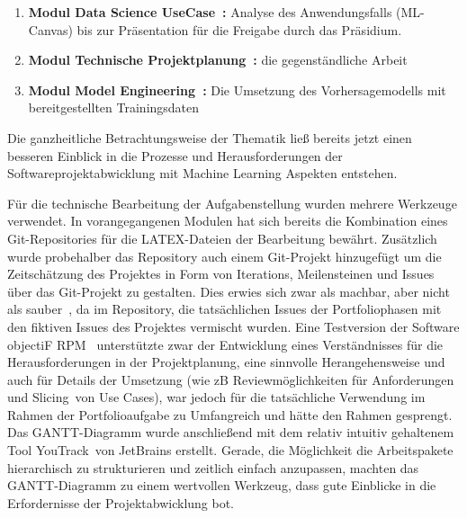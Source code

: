 \begin{enumerate}
  \itemsep-8pt
  \item \textbf{Modul \glqq Data Science UseCase\grqq\ :} Analyse des Anwendungsfalls (ML-Canvas) bis zur Präsentation für die Freigabe durch das Präsidium.
  \item \textbf{Modul \glqq Technische Projektplanung\grqq\ :} die gegenständliche Arbeit
  \item \textbf{Modul \glqq Model Engineering\grqq\ :} Die Umsetzung des Vorhersagemodells mit bereitgestellten Trainingsdaten
\end{enumerate}

Die ganzheitliche Betrachtungsweise der Thematik ließ bereits jetzt  einen besseren Einblick in die Prozesse und Herausforderungen der Softwareprojektabwicklung mit  Machine Learning Aspekten entstehen.

Für die technische Bearbeitung der Aufgabenstellung wurden mehrere Werkzeuge verwendet. In vorangegangenen Modulen hat sich bereits die Kombination eines Git-Repositories für die LATEX-Dateien der Bearbeitung bewährt. Zusätzlich wurde probehalber das Repository auch einem Git-Projekt hinzugefügt um die Zeitschätzung des Projektes in Form von Iterations, Meilensteinen und Issues über das Git-Projekt zu gestalten. Dies erwies sich zwar als machbar, aber nicht als \glqq sauber\grqq\ , da im Repository, die tatsächlichen Issues der Portfoliophasen mit den fiktiven Issues des Projektes vermischt wurden. Eine Testversion der Software \glqq objectiF RPM\grqq\ \citep{microtool_gmbh_objectif_2024} unterstützte zwar der Entwicklung eines Verständnisses für die Herausforderungen in der Projektplanung, eine sinnvolle Herangehensweise und auch für Details der Umsetzung (wie zB Reviewmöglichkeiten für Anforderungen und \glqq Slicing\grqq\ von Use Cases), war jedoch für die tatsächliche Verwendung im Rahmen der Portfolioaufgabe zu Umfangreich und hätte den Rahmen gesprengt. Das GANTT-Diagramm wurde anschließend mit dem relativ intuitiv gehaltenem Tool \glqq YouTrack\grqq\ von JetBrains erstellt. Gerade, die Möglichkeit die Arbeitspakete hierarchisch zu strukturieren und zeitlich einfach anzupassen, machten das GANTT-Diagramm zu einem wertvollen Werkzeug, dass gute Einblicke in die Erfordernisse der Projektabwicklung bot.


